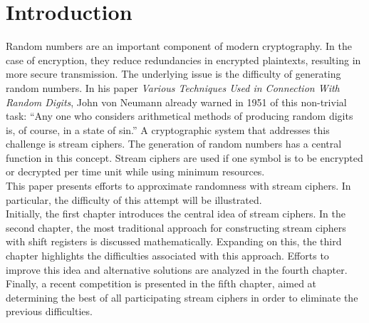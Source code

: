 \section{Introduction}

Random numbers are an important component of modern cryptography. In the case of encryption, they reduce redundancies in encrypted plaintexts, resulting in more secure transmission. \cite[p. 107]{Zhang.2014} The underlying issue is the difficulty of generating random numbers. In his paper \textit{Various Techniques Used in Connection With Random Digits}, John von Neumann already warned in 1951 of this non-trivial task: “Any one who considers arithmetical methods of producing random digits is, of course, in a state of sin.” \cite[p. 36]{vonNeumann1951} A cryptographic system that addresses this challenge is stream ciphers. The generation of random numbers has a central function in this concept. Stream ciphers are used if one symbol is to be encrypted or decrypted per time unit while using minimum resources. \cite[p. 191]{Menezes.2001} \\

This paper presents efforts to approximate randomness with stream ciphers. In particular, the difficulty of this attempt will be illustrated.\\

Initially, the first chapter introduces the central idea of stream ciphers. In the second chapter, the most traditional approach for constructing stream ciphers with shift registers is discussed mathematically. Expanding on this, the third chapter  highlights the difficulties associated with this approach. Efforts to improve this idea and alternative solutions are analyzed in the fourth chapter. Finally, a recent competition is presented in the fifth chapter, aimed at determining the best of all participating stream ciphers in order to eliminate the previous difficulties.

\pagebreak
